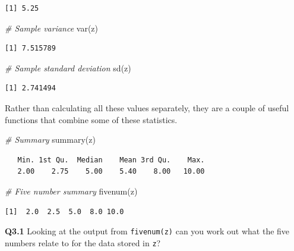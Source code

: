 \documentclass[
  oneside]{krantz}
\newenvironment{Shaded}{\begin{snugshade}}{\end{snugshade}}
\newcommand{\CommentTok}[1]{\textcolor[rgb]{0.56,0.35,0.01}{\textit{#1}}}
\newcommand{\FunctionTok}[1]{\textcolor[rgb]{0.00,0.00,0.00}{#1}}
\newcommand{\NormalTok}[1]{#1}
\begin{document}
\begin{verbatim}
[1] 5.25
\end{verbatim}

\begin{Shaded}
\begin{Highlighting}[]
\CommentTok{\# Sample variance}
\FunctionTok{var}\NormalTok{(z)}
\end{Highlighting}
\end{Shaded}

\begin{verbatim}
[1] 7.515789
\end{verbatim}

\begin{Shaded}
\begin{Highlighting}[]
\CommentTok{\# Sample standard deviation}
\FunctionTok{sd}\NormalTok{(z)}
\end{Highlighting}
\end{Shaded}

\begin{verbatim}
[1] 2.741494
\end{verbatim}

Rather than calculating all these values separately, they are a couple of useful functions that combine some of these statistics.

\begin{Shaded}
\begin{Highlighting}[]
\CommentTok{\# Summary}
\FunctionTok{summary}\NormalTok{(z)}
\end{Highlighting}
\end{Shaded}

\begin{verbatim}
   Min. 1st Qu.  Median    Mean 3rd Qu.    Max. 
   2.00    2.75    5.00    5.40    8.00   10.00 
\end{verbatim}

\begin{Shaded}
\begin{Highlighting}[]
\CommentTok{\# Five number summary}
\FunctionTok{fivenum}\NormalTok{(z)}
\end{Highlighting}
\end{Shaded}

\begin{verbatim}
[1]  2.0  2.5  5.0  8.0 10.0
\end{verbatim}

\textbf{Q3.1} Looking at the output from \texttt{fivenum(z)} can you work out what the five numbers relate to for the data stored in \texttt{z}?
\end{document}
